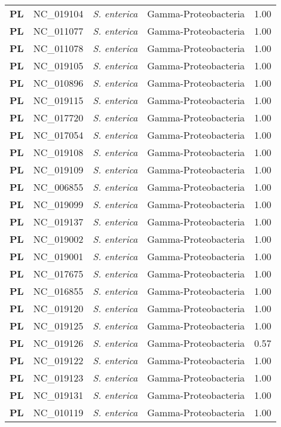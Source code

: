 \begin{adjustwidth}{-3cm}{2cm}
{\begin{supertabular}{>{\bfseries}l|p{0.1\textwidth}p{0.14\textwidth}l|l}
PL & NC\_019104 & \textit{S. enterica} & Gamma-Proteobacteria & 1.00\\
PL & NC\_011077 & \textit{S. enterica} & Gamma-Proteobacteria & 1.00\\
PL & NC\_011078 & \textit{S. enterica} & Gamma-Proteobacteria & 1.00\\
PL & NC\_019105 & \textit{S. enterica} & Gamma-Proteobacteria & 1.00\\
PL & NC\_010896 & \textit{S. enterica} & Gamma-Proteobacteria & 1.00\\
PL & NC\_019115 & \textit{S. enterica} & Gamma-Proteobacteria & 1.00\\
PL & NC\_017720 & \textit{S. enterica} & Gamma-Proteobacteria & 1.00\\
PL & NC\_017054 & \textit{S. enterica} & Gamma-Proteobacteria & 1.00\\
PL & NC\_019108 & \textit{S. enterica} & Gamma-Proteobacteria & 1.00\\
PL & NC\_019109 & \textit{S. enterica} & Gamma-Proteobacteria & 1.00\\
PL & NC\_006855 & \textit{S. enterica} & Gamma-Proteobacteria & 1.00\\
PL & NC\_019099 & \textit{S. enterica} & Gamma-Proteobacteria & 1.00\\
PL & NC\_019137 & \textit{S. enterica} & Gamma-Proteobacteria & 1.00\\
PL & NC\_019002 & \textit{S. enterica} & Gamma-Proteobacteria & 1.00\\
PL & NC\_019001 & \textit{S. enterica} & Gamma-Proteobacteria & 1.00\\
PL & NC\_017675 & \textit{S. enterica} & Gamma-Proteobacteria & 1.00\\
PL & NC\_016855 & \textit{S. enterica} & Gamma-Proteobacteria & 1.00\\
PL & NC\_019120 & \textit{S. enterica} & Gamma-Proteobacteria & 1.00\\
PL & NC\_019125 & \textit{S. enterica} & Gamma-Proteobacteria & 1.00\\
PL & NC\_019126 & \textit{S. enterica} & Gamma-Proteobacteria & 0.57\\
PL & NC\_019122 & \textit{S. enterica} & Gamma-Proteobacteria & 1.00\\
PL & NC\_019123 & \textit{S. enterica} & Gamma-Proteobacteria & 1.00\\
PL & NC\_019131 & \textit{S. enterica} & Gamma-Proteobacteria & 1.00\\
PL & NC\_010119 & \textit{S. enterica} & Gamma-Proteobacteria & 1.00\\

\end{supertabular}}
\end{adjustwidth}
